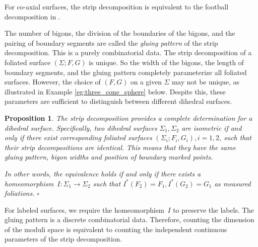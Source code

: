 \documentclass[pdflatex,sn-mathphys]{sn-jnl}%
\numberwithin{equation}{section}
\theoremstyle{thmstyleone}%
\newtheorem{proposition}[theorem]{Proposition}%
\newcommand{\mfoli}{measured foliation}
\newcommand{\homeo}{homeomorphism}
\newcommand{\DEF}{\emph}
\begin{document}
For co-axial surfaces, the strip decomposition is equivalent to the football decomposition in \cite[Theorem 1.3]{WWX22axv}.

\bigskip
The number of bigons, the division of the boundaries of the bigons, and the pairing of boundary segments are called the \DEF{gluing pattern} of the strip decomposition. This is a purely combinatorial data.
The strip decomposition of a foliated surface $(\Sigma;F,G)$ is unique. So the width of the bigons, the length of boundary segments, %
and the gluing pattern completely parameterize all foliated surfaces. However, the choice of $(F,G)$ on a given $\Sigma$ may not be unique, as illustrated in Example \ref{eg:three_cone_sphere} below. Despite this, these parameters are sufficient to distinguish between different dihedral surfaces.

\begin{proposition}
    The strip decomposition provides a complete determination for a dihedral surface. Specifically, two dihedral surfaces $\Sigma_1, \Sigma_2$ are isometric if and only if there exist corresponding foliated surfaces $(\Sigma_i;F_i,G_i), i=1,2$, such that their strip decompositions are identical. This means that they have the same gluing pattern, bigon widths and position of boundary marked points.

    In other words, the equivalence holds if and only if there exists a \homeo\ $I:\Sigma_1\to\Sigma_2$ such that $I^*(F_2)=F_1, I^*(G_2)=G_1$ as \mfoli s.
    \hfill $\square$
\end{proposition}
For labeled surfaces, we require the \homeo\ $I$ to preserve the labels. The gluing pattern is a discrete combinatorial data. Therefore, counting the dimension of the moduli space is equivalent to counting the independent continuous parameters of the strip decomposition.
\end{document}
